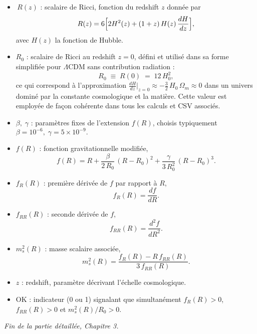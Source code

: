 \begin{itemize}
  \item \(\,R(z)\) : scalaire de Ricci, fonction du redshift \(z\) donnée par  
    \[
      R(z)
      =6\Bigl[2H^2(z)+(1+z)\,H(z)\,\frac{dH}{dz}\Bigr],
    \]
    avec \(H(z)\) la fonction de Hubble.
  \item \(R_{0}\) : scalaire de Ricci au redshift \(z=0\), défini et       utilisé dans sa forme simplifiée pour \(\Lambda\)CDM sans              contribution radiation :  
    \[
    R_{0} \;\equiv\; R(0) \;=\; 12\,H_{0}^{2},
    \]
    ce qui correspond à l’approximation 
    \(\tfrac{dH}{dz}\bigl|_{z=0}\approx -\tfrac{3}{2}\,H_{0}\,\Omega_{m}\approx0\) 
    dans un univers dominé par la constante cosmologique et la matière.  
    Cette valeur est employée de façon cohérente dans tous les calculs et CSV associés.
  \item \(\beta,\;\gamma\) : paramètres fixes de l’extension \(f(R)\), choisis typiquement  
    \(\beta=10^{-6},\;\gamma=5\times10^{-9}.\)
  \item \(f(R)\) : fonction gravitationnelle modifiée,  
    \[
      f(R)
      =R
      +\frac{\beta}{2\,R_{0}}\,(R-R_{0})^{2}
      +\frac{\gamma}{3\,R_{0}^{2}}\,(R-R_{0})^{3}.
    \]
  \item \(f_{R}(R)\) : première dérivée de \(f\) par rapport à \(R\),  
    \[
      f_{R}(R)=\frac{df}{dR}.
    \]
  \item \(f_{RR}(R)\) : seconde dérivée de \(f\),  
    \[
      f_{RR}(R)=\frac{d^{2}f}{dR^{2}}.
    \]
  \item \(m_{s}^{2}(R)\) : masse scalaire associée,  
    \[
      m_{s}^{2}(R)
      =\frac{f_{R}(R)-R\,f_{RR}(R)}{3\,f_{RR}(R)}.
    \]
  \item \(z\) : redshift, paramètre décrivant l’échelle cosmologique.
  \item \(\mathrm{OK}\) : indicateur (0 ou 1) signalant que simultanément  
    \(f_{R}(R)>0\), \(f_{RR}(R)>0\) et \(m_{s}^{2}(R)/R_{0}>0\).
\end{itemize}

\bigskip
\noindent\emph{Fin de la partie détaillée, Chapitre 3.}